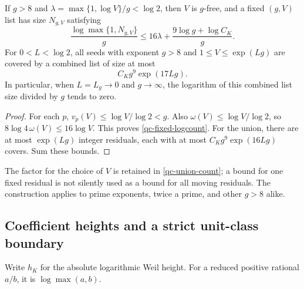 \begin{corollary}\label{qc-lambda-count}
If $g>8$ and $\lambda=\max\{1,\log V\}/g<\log2$, then $V$ is
$g$-free, and a fixed $(g,V)$ list has size $N_{g,V}$ satisfying
\begin{equation}\label{qc-fixed-logcount}
 \frac{\log\max\{1,N_{g,V}\}}g
 \le16\lambda+\frac{9\log g+\log C_K}g.
\end{equation}
For $0<L<\log2$, all seeds with exponent $g>8$ and
$1\le V\le\exp(Lg)$ are covered by a combined list of size at most
\begin{equation}\label{qc-union-count}
 C_Kg^9\exp(17Lg).
\end{equation}
In particular, when $L=L_g\to0$ and $g\to\infty$, the logarithm of
this combined list size divided by $g$ tends to zero.
\end{corollary}
\begin{proof}
For each $p$, $v_p(V)\le\log V/\log2<g$. Also
$\omega(V)\le\log V/\log2$, so
$8\log4\,\omega(V)\le16\log V$. This proves
\eqref{qc-fixed-logcount}. For the union, there are at most
$\exp(Lg)$ integer residuals, each with at most
$C_Kg^9\exp(16Lg)$ covers. Sum these bounds.
\end{proof}

The factor for the choice of $V$ is retained in
\eqref{qc-union-count}; a bound for one fixed residual is not silently
used as a bound for all moving residuals. The construction applies
to prime exponents, twice a prime, and other $g>8$ alike.

\subsection{Coefficient heights and a strict unit-class boundary}

Write $h_K$ for the absolute logarithmic Weil height. For a reduced
positive rational $a/b$, it is $\log\max(a,b)$.


